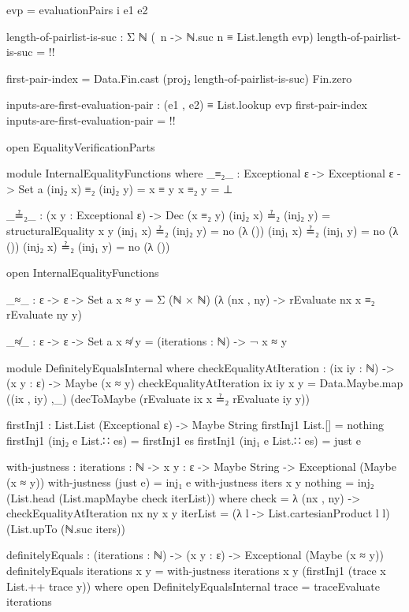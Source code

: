 \documentclass{report}
\begin{document}
\begin{code}
      evp = evaluationPairs i e1 e2

      length-of-pairlist-is-suc : Σ ℕ (\ n -> ℕ.suc n ≡ List.length evp)
      length-of-pairlist-is-suc = {!!}

      first-pair-index = Data.Fin.cast (proj₂ length-of-pairlist-is-suc) Fin.zero

      inputs-are-first-evaluation-pair :
        (e1 , e2) ≡ List.lookup evp first-pair-index
      inputs-are-first-evaluation-pair = {!!}

  open EqualityVerificationParts

  module InternalEqualityFunctions where
    _≡₂_ : Exceptional ε -> Exceptional ε -> Set a
    (inj₂ x) ≡₂ (inj₂ y) = x ≡ y
    x ≡₂ y = ⊥

    _≟₂_ : (x y : Exceptional ε) -> Dec (x ≡₂ y)
    (inj₂ x) ≟₂ (inj₂ y) = structuralEquality x y
    (inj₁ x) ≟₂ (inj₂ y) = no (λ ())
    (inj₁ x) ≟₂ (inj₁ y) = no (λ ())
    (inj₂ x) ≟₂ (inj₁ y) = no (λ ())

  open InternalEqualityFunctions

  _≈_ : ε -> ε -> Set a
  x ≈ y = Σ (ℕ × ℕ) (λ (nx , ny) -> rEvaluate nx x ≡₂ rEvaluate ny y)

  _≉_ : ε -> ε -> Set a
  x ≉ y = (iterations : ℕ) -> ¬ x ≈ y

  module DefinitelyEqualsInternal where
    checkEqualityAtIteration :
      (ix iy : ℕ) ->
      (x y : ε) ->
      Maybe (x ≈ y)
    checkEqualityAtIteration ix iy x y =
      Data.Maybe.map ((ix , iy) ,_) (decToMaybe (rEvaluate ix x ≟₂ rEvaluate iy y))

    firstInj1 : List.List (Exceptional ε) -> Maybe String
    firstInj1 List.[] = nothing
    firstInj1 (inj₂ e List.∷ es) = firstInj1 es
    firstInj1 (inj₁ e List.∷ es) = just e

    with-justness : {iterations : ℕ} ->
                    {x y : ε} ->
                    Maybe String ->
                    Exceptional (Maybe (x ≈ y))
    with-justness (just e) = inj₁ e
    with-justness {iters} {x} {y} nothing =
      inj₂ (List.head (List.mapMaybe check iterList))
      where
      check = λ (nx , ny) -> checkEqualityAtIteration nx ny x y
      iterList = (λ l -> List.cartesianProduct l l) (List.upTo (ℕ.suc iters))

  definitelyEquals : (iterations : ℕ) ->
                     (x y : ε) ->
                     Exceptional (Maybe (x ≈ y))
  definitelyEquals iterations x y =
    with-justness {iterations} {x} {y} (firstInj1 (trace x List.++ trace y))
    where
    open DefinitelyEqualsInternal
    trace = traceEvaluate iterations


\end{code}
\end{document}
